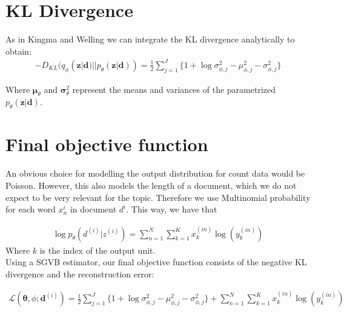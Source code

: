 \section{KL Divergence}


As in Kingma and Welling we can integrate the KL divergence analytically to obtain: \\


\begin{align}
- D_{KL}(q_\phi (\mathbf{z}| \mathbf{d})||p_\theta (\mathbf{z}| \mathbf{d})) = \frac{1}{2}\sum\limits_{j=1}^{J}\{1+\log \sigma_{\phi ,j}^2 - \mu_{\phi,j}^2 - \sigma_{\phi ,j}^2\}
\end{align}

Where $\mathbf{\mu}_\theta$ and $\mathbf{\sigma}_\theta^2$ represent the means and variances of the parametrized $p_\theta(\mathbf{z}|\mathbf{d})$.

\section{Final objective function}

An obvious choice for modelling the output distribution for count data would be Poisson. However, this also models the length of a document, which we do not expect to be very relevant for the topic. Therefore we use Multinomial probability for each word $x_n^{i}$ in document $d^{i}$. This way, we have that



\begin{align}
\log p_{\theta}(d^{(i)}|z^{(i)}) = 
\sum_{n=1}^N
\sum_{k=1}^K x_k^{(in)} \log (y_k^{(in)})
\end{align}
Where $k$ is the index of the output unit.\\


Using a SGVB estimator, our final objective function consists of the negative KL divergence and the reconstruction error:

\begin{align}
\mathcal{L}(\mathbf{\theta}, \phi; \mathbf{d}^{(i)}) = \frac{1}{2}\sum\limits_{j=1}^{J}\{1+\log \sigma_{\phi ,j}^2 - \mu_{\phi,j}^2 - \sigma_{\phi ,j}^2\} 
+ \sum_{n=1}^N
\sum_{k=1}^K x_k^{(in)} \log (y_k^{(in)})
\end{align}
